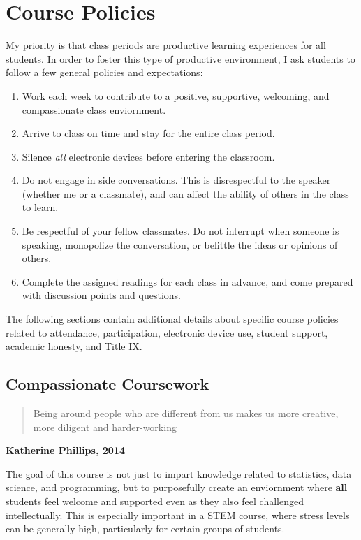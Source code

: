 \documentclass[]{book}
\providecommand{\tightlist}{%
  \setlength{\itemsep}{0pt}\setlength{\parskip}{0pt}}
\theoremstyle{definition}
\theoremstyle{definition}
\theoremstyle{definition}
\theoremstyle{remark}
\begin{document}
\chapter{Course Policies}\label{course-policies}

My priority is that class periods are productive learning experiences
for all students. In order to foster this type of productive
environment, I ask students to follow a few general policies and
expectations:

\begin{enumerate}
\def\labelenumi{\arabic{enumi}.}
\tightlist
\item
  Work each week to contribute to a positive, supportive, welcoming, and
  compassionate class enviornment.
\item
  Arrive to class on time and stay for the entire class period.
\item
  Silence \emph{all} electronic devices before entering the classroom.
\item
  Do not engage in side conversations. This is disrespectful to the
  speaker (whether me or a classmate), and can affect the ability of
  others in the class to learn.
\item
  Be respectful of your fellow classmates. Do not interrupt when someone
  is speaking, monopolize the conversation, or belittle the ideas or
  opinions of others.
\item
  Complete the assigned readings for each class in advance, and come
  prepared with discussion points and questions.
\end{enumerate}

The following sections contain additional details about specific course
policies related to attendance, participation, electronic device use,
student support, academic honesty, and Title IX.

\section{Compassionate Coursework}\label{compassionate-coursework}

\begin{quote}
Being around people who are different from us makes us more creative,
more diligent and harder-working
\end{quote}

\textbf{\href{https://www.scientificamerican.com/article/how-diversity-makes-us-smarter/}{Katherine
Phillips, 2014}}

 The goal of this course is not just to impart knowledge related to
statistics, data science, and programming, but to purposefully create an
enviornment where \textbf{all} students feel welcome and supported even
as they also feel challenged intellectually. This is especially
important in a STEM course, where stress levels can be generally high,
particularly for certain groups of students.
\end{document}
